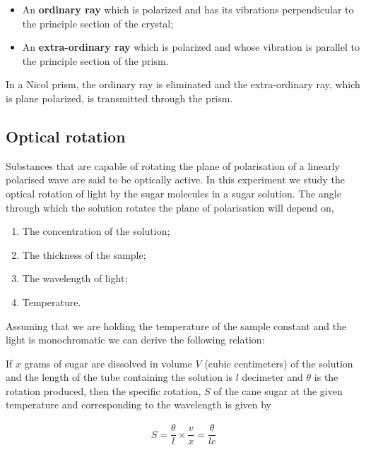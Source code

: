 \documentclass{dkpinto-report}
\begin{document}
\begin{itemize} %
\item An \textbf{ordinary ray} which is polarized and has its vibrations perpendicular to the principle section of the crystal;
\item An \textbf{extra-ordinary ray} which is polarized and whose vibration is parallel to the principle section of the prism.
\end{itemize}

In a Nicol prism, the ordinary ray is eliminated and the extra-ordinary ray, which is plane polarized, is transmitted through the prism.

\subsection{Optical rotation}
Substances that are capable of rotating the plane of polarisation of a linearly polarised wave are said to be optically active. In this experiment we study the optical rotation of light by the sugar molecules in a sugar solution. The angle through which the solution rotates the plane of polarisation will depend on,

\begin{enumerate}
\item The concentration of the solution;
\item The thickness of the sample;
\item The wavelength of light; 
\item Temperature.
\end{enumerate}
Assuming that we are holding the temperature of the sample constant and the light is monochromatic we can derive the following relation:

If $x$ grams of sugar are dissolved in volume $V$ (cubic centimeters) of the solution and the length of the tube containing the solution is $l$ decimeter and $\theta$ is the rotation produced, then the specific rotation, $S$ of the cane sugar at the  given temperature and corresponding to the wavelength  is given by 

\begin{align*}
S  = \dfrac{\theta}{l} \times \dfrac{v}{x}  = \dfrac{\theta}{lc}
\end{align*}


\end{document}
